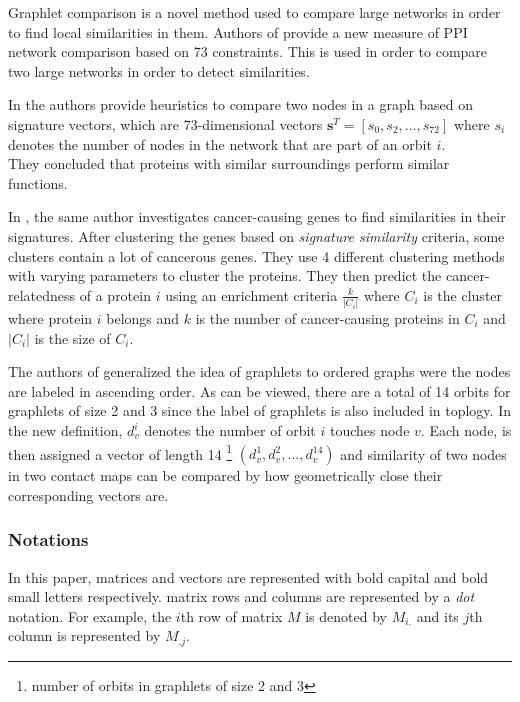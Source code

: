 \documentclass[a4,center,fleqn]{NAR}
\begin{document}
Graphlet comparison is a novel method used to compare 
large networks in order to
find local similarities in them.
Authors of \cite{prvzulj2007biological} 
provide a new measure of PPI
network comparison
based on 73 constraints. This is used in order to compare two large
networks in order to detect similarities.

In \cite{milenkoviae2008uncovering} the authors
 provide heuristics to compare two nodes in a graph
based on signature vectors, which are 73-dimensional vectors
$\mathbf{s}^T
= [s_0, s_2, ..., s_{72}]$ where $s_i$ denotes the number of nodes in
the network that are part of an orbit $i$. \\
They concluded that proteins with similar surroundings perform
similar functions.

In \cite{milenkovic2010cancer}, the same author investigates 
cancer-causing genes to find similarities in their signatures. After
clustering the genes based on \textit{signature similarity} criteria,
some clusters contain a lot of cancerous genes.
They use 4 different clustering methods with varying parameters to cluster
the proteins. They then predict the cancer-relatedness of a protein 
$i$ using
an enrichment criteria $\frac{k}{|C_i|}$ where $C_i$ is the cluster
where protein $i$ belongs and $k$ is the number of cancer-causing
proteins in $C_i$ and $|C_i|$ is the size of $C_i$.


The authors of \cite{di2010fast} generalized the idea of graphlets to 
ordered graphs were the nodes are labeled in ascending order.
As can be viewed, there are a total of 14 orbits for graphlets of size
2 and 3 since the label of graphlets is also included in toplogy.
In the new definition, $d_v^i$ denotes the number of orbit $i$ touches 
node $v$. Each node, is then assigned a vector of length 14 
\footnote{number of orbits in graphlets of size 2 and 3}
$(d_v^1, d_v^2, ..., d_v^{14})$ 
and similarity of two nodes in two contact maps can be compared by
how geometrically close their corresponding vectors are.

\subsubsection{Notations}
In this paper, matrices and vectors are represented with bold
capital and bold small letters respectively.
matrix rows and columns are represented by a \textit{dot}
notation. For example, the $i$th row of matrix $M$ is
denoted by $M_{i.}$ and its $j$th column is represented
by $M_{.j}$.
\end{document}
